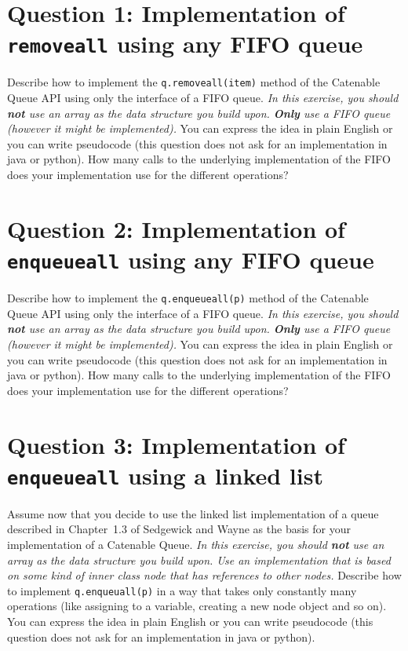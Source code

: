 \documentclass{tufte-handout}
\begin{document}
\section{\textbf{Question 1}: Implementation of \texttt{removeall} using any FIFO queue}

Describe how to implement the \texttt{q.removeall(item)} method of the Catenable Queue API using only the interface of a FIFO queue.
\emph{In this exercise, you should \textbf{not} use an array as the data structure you build upon. \textbf{Only} use a FIFO queue (however it might be implemented).}
You can express the idea in plain English or you can write pseudocode (this question does not ask for an implementation in java or python).
How many calls to the underlying implementation of the  FIFO does your implementation use for the different operations?

\section{\textbf{Question 2}: Implementation of \texttt{enqueueall} using any FIFO queue}

Describe how to implement the \texttt{q.enqueueall(p)} method of the Catenable Queue API using only the interface of a FIFO queue.
\emph{In this exercise, you should \textbf{not} use an array as the data structure you build upon. \textbf{Only} use a FIFO queue (however it might be implemented).}
You can express the idea in plain English or you can write pseudocode (this question does not ask for an implementation in java or python).
How many calls to the underlying implementation of the  FIFO does your implementation use for the different operations?

\section{\textbf{Question 3}: Implementation of \texttt{enqueueall} using a linked list}

Assume now that you decide to use the linked list implementation of a queue described in Chapter~1.3 of Sedgewick and Wayne as the basis for your implementation of a Catenable Queue.
\emph{In this exercise, you should \textbf{not} use an array as the data structure you build upon.
  Use an implementation that is based on some kind of inner class node that has references to other nodes.}
Describe how to implement \texttt{q.enqueuall(p)} in a way that takes only constantly many operations (like assigning to a variable, creating a new node object and so on).
You can express the idea in plain English or you can write pseudocode (this question does not ask for an implementation in java or python).
\end{document}
